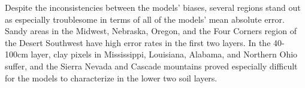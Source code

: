 Despite the inconsistencies between the models' biases, several regions stand out as especially troublesome in terms of all of the models' mean absolute error. Sandy areas in the Midwest, Nebraska, Oregon, and the Four Corners region of the Desert Southwest have high error rates in the first two layers. In the 40-100cm layer, clay pixels in Mississippi, Louisiana, Alabama, and Northern Ohio suffer, and the Sierra Nevada and Cascade mountains proved especially difficult for the models to characterize in the lower two soil layers.

%
%

%
%

%
%

%
%

